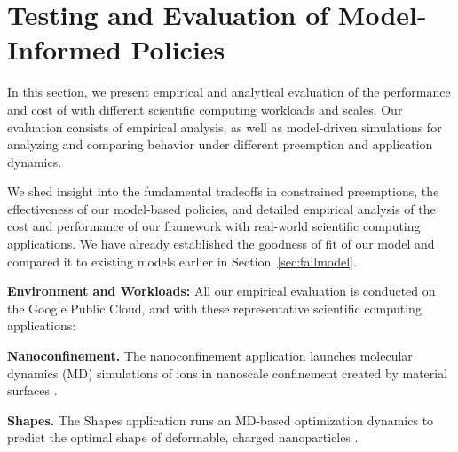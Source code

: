 \vspace*{\subsecspace}
\section{Testing and Evaluation of Model-Informed Policies}
\label{sec:eval}

%

In this section, we present empirical and analytical evaluation of the performance and cost of \sysname with different scientific computing workloads and scales. 
Our evaluation consists of empirical analysis, as well as model-driven simulations for analyzing and comparing \sysname behavior under different preemption and application dynamics.

We shed insight into the fundamental tradeoffs in constrained preemptions, the effectiveness of our model-based policies, and detailed empirical analysis of the cost and performance of our \sysname framework with real-world scientific computing applications. 
We have already established the goodness of fit of our model and compared it to existing models earlier in Section~\ref{sec:failmodel}. 


\noindent \textbf{Environment and Workloads:} All our empirical evaluation is conducted on the Google Public Cloud, and with these representative scientific computing applications: 

\noindent \textbf{Nanoconfinement.}
The nanoconfinement application launches molecular dynamics (MD) simulations of ions in nanoscale confinement created by material surfaces \cite{jyto,kadupitiya2017}.

\noindent \textbf{Shapes.} The Shapes application runs an MD-based optimization dynamics to predict the optimal shape of deformable, charged nanoparticles \cite{jto1,jjzo1}. 

